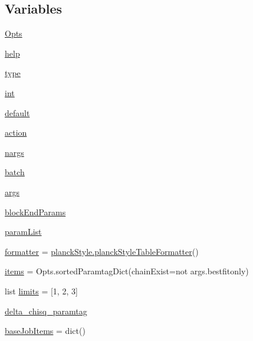 \subsection*{Variables}
\begin{DoxyCompactItemize}
\item 
\mbox{\hyperlink{namespacemakeTables_a8ad1bde4748e8305c2ce61a4ad2be6d5}{Opts}}
\item 
\mbox{\hyperlink{namespacemakeTables_ae8c001a1f979481f44220b26973e49d9}{help}}
\item 
\mbox{\hyperlink{namespacemakeTables_a4c68a93e87904d243720fd0eaf745cab}{type}}
\item 
\mbox{\hyperlink{namespacemakeTables_ae905fd0466745c7f0de3d5be4a4e028b}{int}}
\item 
\mbox{\hyperlink{namespacemakeTables_a39bcb1df00a479b707a2fd4e58fc17ed}{default}}
\item 
\mbox{\hyperlink{namespacemakeTables_a3b2f1d30c511cac7193f773834aaf3c2}{action}}
\item 
\mbox{\hyperlink{namespacemakeTables_a32cc6ce3ad708e122a8f8dea4705181c}{nargs}}
\item 
\mbox{\hyperlink{namespacemakeTables_ab682e9d6c710896b62dc432a5790fc3b}{batch}}
\item 
\mbox{\hyperlink{namespacemakeTables_ab477fc55b0cb501f409212677cc13fe5}{args}}
\item 
\mbox{\hyperlink{namespacemakeTables_ada843f13aecf420802601726ae1b43c6}{block\+End\+Params}}
\item 
\mbox{\hyperlink{namespacemakeTables_a2862558f8e3b6ae1cf6624f2fcbfaaa1}{param\+List}}
\item 
\mbox{\hyperlink{namespacemakeTables_a43b05f113768d259a9749ab4b2fe65a6}{formatter}} = \mbox{\hyperlink{classplanckStyle_1_1planckStyleTableFormatter}{planck\+Style.\+planck\+Style\+Table\+Formatter}}()
\item 
\mbox{\hyperlink{namespacemakeTables_a35731598170459a5830e249895263c69}{items}} = Opts.\+sorted\+Paramtag\+Dict(chain\+Exist=not args.\+bestfitonly)
\item 
list \mbox{\hyperlink{namespacemakeTables_a149e498d0bb0bfc39a1d52bc91a52617}{limits}} = \mbox{[}1, 2, 3\mbox{]}
\item 
\mbox{\hyperlink{namespacemakeTables_aef06ff64d1799caf6a88ee42ab643b11}{delta\+\_\+chisq\+\_\+paramtag}}
\item 
\mbox{\hyperlink{namespacemakeTables_a8faee9012fb81d39cef65b9231ca7d14}{base\+Job\+Items}} = dict()
\item 

\end{DoxyCompactItemize}
